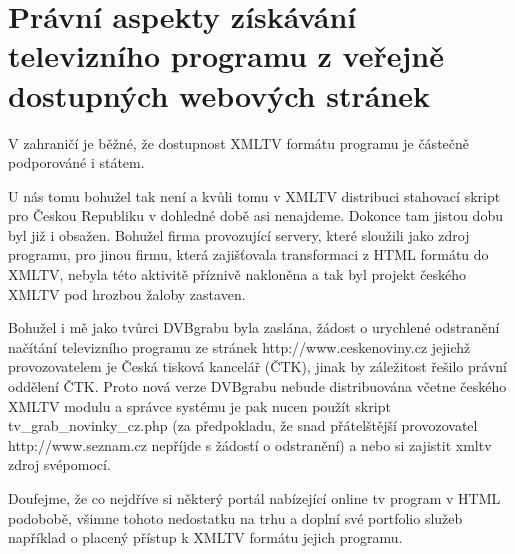 \vspace{10pt}

\section{Právní aspekty získávání televizního programu z veřejně dostupných webových stránek}

\vspace{10pt}

V zahraničí je běžné, že dostupnost XMLTV formátu programu je částečně podporováné i státem. 

\vspace{10pt}

U nás tomu bohužel tak není a kvůli tomu v XMLTV distribuci stahovací skript pro Českou Republiku v dohledné době asi nenajdeme. Dokonce tam jistou dobu byl již i obsažen. Bohužel firma provozující servery, které sloužili jako zdroj programu, pro jinou firmu, která zajišťovala transformaci z HTML formátu do XMLTV, nebyla této aktivitě příznivě nakloněna a tak byl projekt českého XMLTV pod hrozbou žaloby zastaven.

\vspace{10pt}

Bohužel i mě jako tvůrci DVBgrabu byla zaslána, žádost o urychlené odstranění načítání televizního programu ze stránek http://www.ceskenoviny.cz jejichž provozovatelem je Česká tisková kancelář (ČTK), jinak by záležitost řešilo právní oddělení ČTK. Proto nová verze DVBgrabu nebude distribuována včetne českého XMLTV modulu a správce systému je pak nucen použít skript tv\_grab\_novinky\_cz.php (za předpokladu, že snad přátelštější provozovatel http://www.seznam.cz nepříjde s žádostí o odstranění) a nebo si zajistit xmltv zdroj svépomocí.

\vspace{10pt}

Doufejme, že co nejdříve si některý portál nabízející online tv program v HTML podobobě, všimne tohoto nedostatku na trhu a doplní své portfolio služeb například o placený přístup k XMLTV formátu jejich programu.
